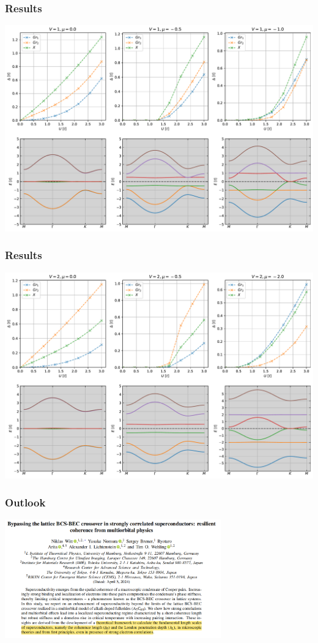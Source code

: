 \documentclass[aspectratio=169]{beamer}
\begin{document}
\begin{frame}[t]
	\frametitle{Results}
	
	\begin{center}
		\includegraphics[width=0.65\linewidth]{figs/gap_size_vs_U_egx_uniform_U_V_1}
	\end{center}
\end{frame}

\begin{frame}[t]
	\frametitle{Results}
	
	\begin{center}
		\includegraphics[width=0.65\linewidth]{figs/gap_size_vs_U_egx_uniform_U_V_2}
	\end{center}
\end{frame}


	

\begin{frame}
	\frametitle{Outlook}
	
	\begin{center}
		\includegraphics[width=0.7\textwidth]{figs/Witt 2024 Paper Screenshot}
	\end{center}
\end{frame}
\end{document}
